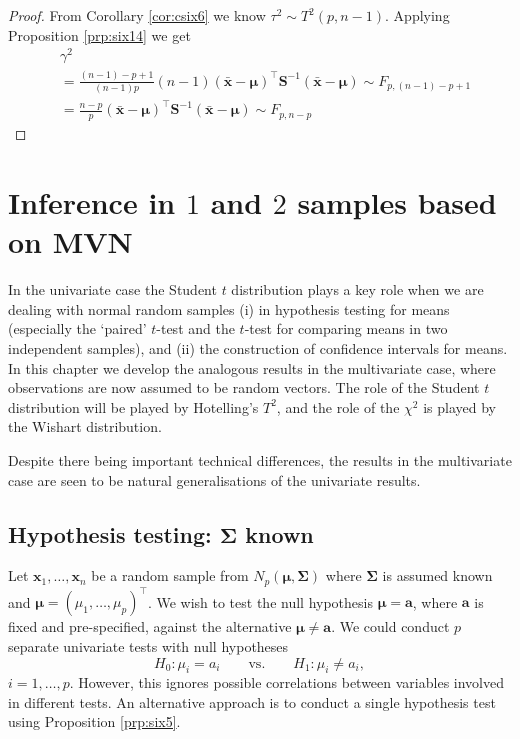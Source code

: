 \documentclass[]{book}
\theoremstyle{definition}
\theoremstyle{definition}
\theoremstyle{definition}
\theoremstyle{remark}
\begin{document}
\begin{proof}
{}From Corollary \ref{cor:csix6} we know \(\tau^2 \sim T^2(p,n-1)\). Applying Proposition \ref{prp:six14} we get
\begin{align*}
&\gamma^2\\
& = \frac{(n-1)-p+1}{(n-1)p}(n-1)(\bar{\boldsymbol x}-\boldsymbol \mu)^\top \boldsymbol S^{-1} (\bar{\boldsymbol x}-\boldsymbol \mu) \sim F_{p,(n-1)-p+1} \\
&= \frac{n-p}{p}(\bar{\boldsymbol x}-\boldsymbol \mu)^\top \boldsymbol S^{-1} (\bar{\boldsymbol x}-\boldsymbol \mu) \sim F_{p,n-p}
\end{align*}
\end{proof}

\hypertarget{inference-in-1-and-2-samples-based-on-mvn}{%
\chapter{\texorpdfstring{Inference in \(1\) and \(2\) samples based on MVN}{Inference in 1 and 2 samples based on MVN}}\label{inference-in-1-and-2-samples-based-on-mvn}}

In the univariate case the Student \(t\) distribution plays a key role when we are dealing with normal random samples (i) in hypothesis testing for means (especially the `paired' \(t\)-test and the \(t\)-test for comparing means in two independent samples), and (ii) the construction of confidence intervals for means. In this chapter we develop the analogous results in the multivariate case, where observations are now assumed to be random vectors. The role of the Student \(t\) distribution will be played by Hotelling's \(T^2\), and the role of the \(\chi^2\) is played by the Wishart distribution.

Despite there being important technical differences, the results in the multivariate case are seen to be natural generalisations of the univariate results.

\hypertarget{hypothesis-testing-boldsymbol-sigma-known}{%
\section{\texorpdfstring{Hypothesis testing: \(\boldsymbol \Sigma\) known}{Hypothesis testing: \textbackslash{}boldsymbol \textbackslash{}Sigma known}}\label{hypothesis-testing-boldsymbol-sigma-known}}

Let \(\boldsymbol x_1,\ldots,\boldsymbol x_n\) be a random sample from \(N_p(\boldsymbol \mu,\boldsymbol \Sigma)\) where \(\boldsymbol \Sigma\) is assumed known and \(\boldsymbol \mu= (\mu_1,\ldots,\mu_p)^\top\). We wish to test the null hypothesis \(\boldsymbol \mu= \boldsymbol a\), where \(\boldsymbol a\) is fixed and pre-specified, against the alternative \(\boldsymbol \mu\neq \boldsymbol a\). We could conduct \(p\) separate univariate tests with null hypotheses \[H_0: \mu_i = a_i \qquad \text{vs.} \qquad H_1: \mu_i \neq a_i,\] \(i=1,\ldots,p.\) However, this ignores possible correlations between variables involved in different tests. An alternative approach is to conduct a single hypothesis test using Proposition \ref{prp:six5}.
\end{document}

